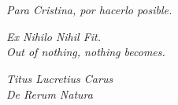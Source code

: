 
\chapter*{}
\epigraph{\textit{Para Cristina, por hacerlo posible.}}{}
\epigraph{\textit{Ex Nihilo Nihil Fit.\\
Out of nothing, nothing becomes.}}{\textit{Titus Lucretius Carus\\De Rerum Natura}}
